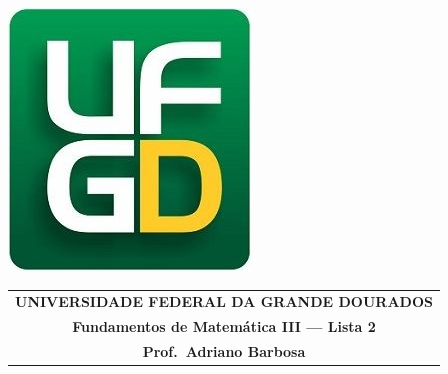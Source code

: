 \documentclass[a4paper,5pt]{amsbook}
\begin{document}
\thispagestyle{empty}
\pagestyle{empty}
\begin{minipage}[h]{0.14\textwidth}
	\includegraphics[scale=0.24]{../ufgd.png}
\end{minipage}
\begin{minipage}[h]{\textwidth}
\begin{tabular}{c}
{{\bf UNIVERSIDADE FEDERAL DA GRANDE DOURADOS}}\\
{{\bf Fundamentos de Matem\'{a}tica III --- Lista 2}}\\
{{\bf Prof.\ Adriano Barbosa}}\\
\end{tabular}
\vspace{-0.45cm}
%
\end{minipage}

\end{document}
